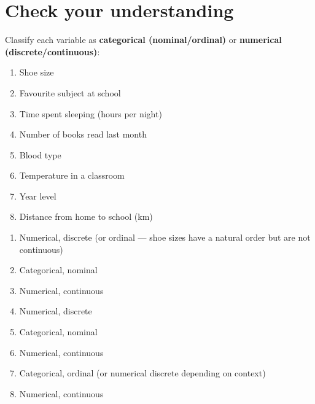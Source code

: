 \documentclass[
  11pt,
  a4paper,
  oneside,
  open=any]{scrbook}
\providecommand{\tightlist}{%
  \setlength{\itemsep}{0pt}\setlength{\parskip}{0pt}}
\begin{document}
\section{Check your understanding}\label{check-your-understanding-1}

Classify each variable as \textbf{categorical (nominal/ordinal)} or
\textbf{numerical (discrete/continuous)}:

\begin{enumerate}
\def\labelenumi{\arabic{enumi}.}
\tightlist
\item
  Shoe size
\item
  Favourite subject at school
\item
  Time spent sleeping (hours per night)
\item
  Number of books read last month
\item
  Blood type
\item
  Temperature in a classroom
\item
  Year level
\item
  Distance from home to school (km)
\end{enumerate}

\begin{tcolorbox}[enhanced jigsaw, breakable, leftrule=.75mm, bottomtitle=1mm, bottomrule=.15mm, titlerule=0mm, left=2mm, opacitybacktitle=0.6, coltitle=black, colbacktitle=quarto-callout-note-color!10!white, rightrule=.15mm, title=\textcolor{quarto-callout-note-color}{\faInfo}\hspace{0.5em}{Answers}, toptitle=1mm, arc=.35mm, colback=white, toprule=.15mm, colframe=quarto-callout-note-color-frame, opacityback=0]

\begin{enumerate}
\def\labelenumi{\arabic{enumi}.}
\tightlist
\item
  Numerical, discrete (or ordinal --- shoe sizes have a natural order
  but are not continuous)
\item
  Categorical, nominal
\item
  Numerical, continuous
\item
  Numerical, discrete
\item
  Categorical, nominal
\item
  Numerical, continuous
\item
  Categorical, ordinal (or numerical discrete depending on context)
\item
  Numerical, continuous
\end{enumerate}

\end{tcolorbox}
\end{document}
